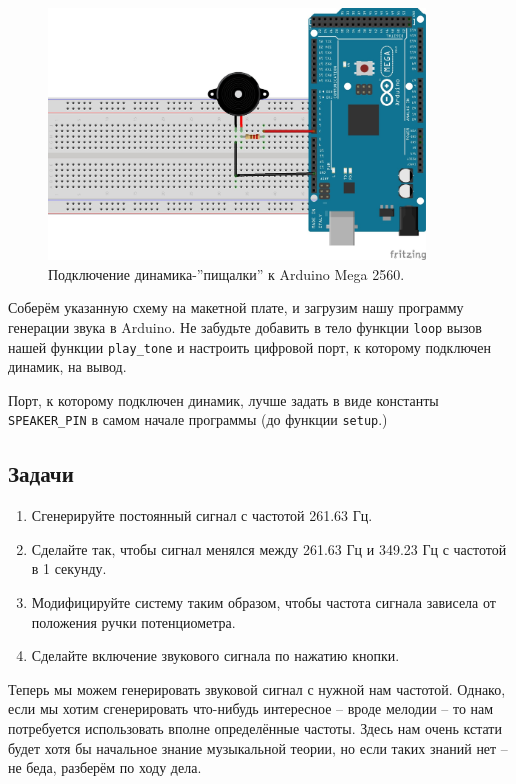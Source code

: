 \documentclass[a4paper,twoside]{book}
\begin{document}
\begin{figure}[h]
  \caption{Подключение динамика-''пищалки'' к Arduino Mega 2560.}
  \label{fig:sound-fig-2}
  \includegraphics[width=10cm]{sound-fig-2}
  \centering
\end{figure}

Соберём указанную схему на макетной плате, и загрузим нашу программу генерации
звука в Arduino. Не забудьте добавить в тело функции \texttt{loop} вызов нашей
функции \texttt{play\_tone} и настроить цифровой порт, к которому подключен
динамик, на вывод.

Порт, к которому подключен динамик, лучше задать в виде константы
\texttt{SPEAKER\_PIN} в самом начале программы (до функции \texttt{setup}.)

\subsection{Задачи}
\begin{enumerate}
\item Сгенерируйте постоянный сигнал с частотой 261.63 Гц.
\item Сделайте так, чтобы сигнал менялся между 261.63 Гц и 349.23 Гц с частотой
  в 1 секунду. 
\item Модифицируйте систему таким образом, чтобы частота сигнала зависела от
  положения ручки потенциометра. 
\item Сделайте включение звукового сигнала по нажатию кнопки.
\end{enumerate}

Теперь мы можем генерировать звуковой сигнал с нужной нам частотой. Однако, если
мы хотим сгенерировать что-нибудь интересное -- вроде мелодии -- то нам
потребуется использовать вполне определённые частоты. Здесь нам очень кстати
будет хотя бы начальное знание музыкальной теории, но если таких знаний нет --
не беда, разберём по ходу дела.
\end{document}
